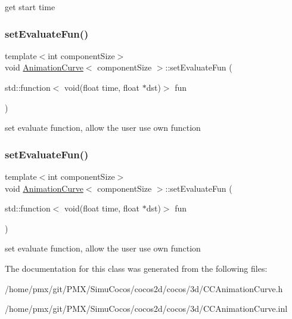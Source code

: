 get start time \mbox{\label{classAnimationCurve_a9b727759116fa4f25f2673bc93c90b37}} 
\subsubsection{\texorpdfstring{set\+Evaluate\+Fun()}{setEvaluateFun()}\hspace{0.1cm}{\footnotesize\ttfamily [1/2]}}
{\footnotesize\ttfamily template$<$int component\+Size$>$ \\
void \hyperlink{classAnimationCurve}{Animation\+Curve}$<$ component\+Size $>$\+::set\+Evaluate\+Fun (\begin{DoxyParamCaption}\item[{std\+::function$<$ void(float time, float $\ast$dst)$>$}]{fun }\end{DoxyParamCaption})}

set evaluate function, allow the user use own function \mbox{\label{classAnimationCurve_a9b727759116fa4f25f2673bc93c90b37}} 
\subsubsection{\texorpdfstring{set\+Evaluate\+Fun()}{setEvaluateFun()}\hspace{0.1cm}{\footnotesize\ttfamily [2/2]}}
{\footnotesize\ttfamily template$<$int component\+Size$>$ \\
void \hyperlink{classAnimationCurve}{Animation\+Curve}$<$ component\+Size $>$\+::set\+Evaluate\+Fun (\begin{DoxyParamCaption}\item[{std\+::function$<$ void(float time, float $\ast$dst)$>$}]{fun }\end{DoxyParamCaption})}

set evaluate function, allow the user use own function 

The documentation for this class was generated from the following files\+:\begin{DoxyCompactItemize}
\item 
/home/pmx/git/\+P\+M\+X/\+Simu\+Cocos/cocos2d/cocos/3d/C\+C\+Animation\+Curve.\+h\item 
/home/pmx/git/\+P\+M\+X/\+Simu\+Cocos/cocos2d/cocos/3d/C\+C\+Animation\+Curve.\+inl\end{DoxyCompactItemize}
